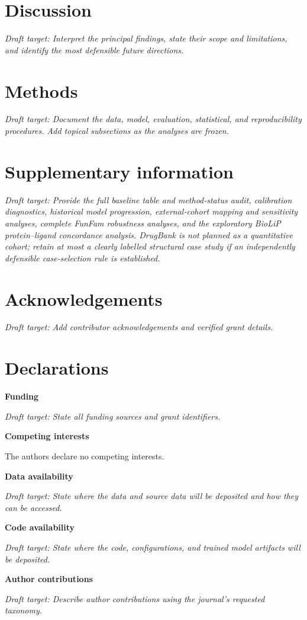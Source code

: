 \documentclass[pdflatex,sn-mathphys-num]{sn-jnl}
\newcommand{\draftplaceholder}[1]{%
  \par\smallskip\noindent
  \begingroup\color{gray}\textit{Draft target: #1}\endgroup
  \par\smallskip}
\begin{document}
\section{Discussion}\label{sec:discussion}

\draftplaceholder{Interpret the principal findings, state their scope and limitations, and identify the most defensible future directions.}

\section{Methods}\label{sec:methods}

\draftplaceholder{Document the data, model, evaluation, statistical, and reproducibility procedures. Add topical subsections as the analyses are frozen.}

\backmatter

\section*{Supplementary information}

\draftplaceholder{Provide the full baseline table and method-status audit, calibration
diagnostics, historical model progression, external-cohort mapping and sensitivity
analyses, complete FunFam robustness analyses, and the exploratory BioLiP
protein--ligand concordance analysis. DrugBank is not planned as a quantitative cohort;
retain at most a clearly labelled structural case study if an independently defensible
case-selection rule is established.}

\section*{Acknowledgements}

\draftplaceholder{Add contributor acknowledgements and verified grant details.}

\section*{Declarations}

\noindent\textbf{Funding}

\draftplaceholder{State all funding sources and grant identifiers.}

\noindent\textbf{Competing interests}

The authors declare no competing interests.

\noindent\textbf{Data availability}

\draftplaceholder{State where the data and source data will be deposited and how they can be accessed.}

\noindent\textbf{Code availability}

\draftplaceholder{State where the code, configurations, and trained model artifacts will be deposited.}

\noindent\textbf{Author contributions}

\draftplaceholder{Describe author contributions using the journal's requested taxonomy.}

% 
\end{document}
